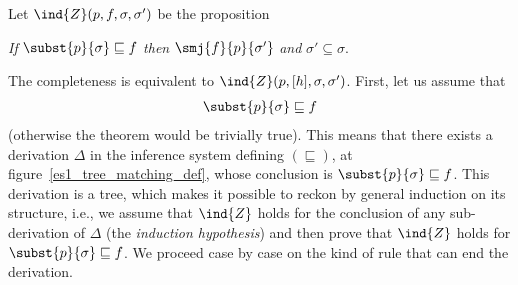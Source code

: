 Let \(\ind{Z}({p}, f, \sigma, \sigma')\) be the proposition
\begin{center}
\emph{If}   \(\subst{{p}}{\sigma} \sqsubseteq f\)
\emph{then} \(\smj{f}{{p}}{\sigma'}\)
\emph{and} \(\sigma' \subseteq \sigma\).
\end{center}
The completeness is equivalent to \(\ind{Z}({p}, [h], \sigma,
\sigma')\). First, let us assume that
\begin{align}
  \subst{{p}}{\sigma} \sqsubseteq f \label{es1:compl:1}
\end{align}
(otherwise the theorem would be trivially true). This means that there
exists a derivation \(\Delta\) in the inference system defining
\((\sqsubseteq)\), at figure~\ref{es1_tree_matching_def}, whose
conclusion is \(\subst{{p}}{\sigma} \sqsubseteq f\). This
derivation is a tree, which makes it possible to reckon by general
induction on its structure, i.e., we assume that \(\ind{Z}\) holds for
the conclusion of any sub\hyp{}derivation of \(\Delta\) (the
\emph{induction hypothesis}) and then prove that \(\ind{Z}\) holds for
\(\subst{{p}}{\sigma} \sqsubseteq f\). We proceed case by
case on the kind of rule that can end the derivation.
